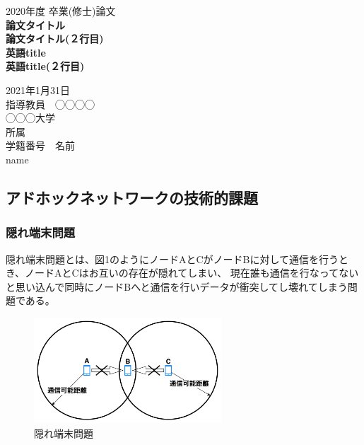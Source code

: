 \documentclass[a4paper, 10pt]{ltjsarticle}
\begin{document}
\thispagestyle{empty}
\begin{center}

\vspace{20mm}
{\Large\noindent 2020年度 卒業(修士)論文}\\
\vspace{40mm}
{\huge\noindent\textbf{論文タイトル}}\\
\medskip
{\huge\noindent\textbf{論文タイトル(２行目)}}\\
\vspace{\baselineskip}
{\huge\noindent\textbf{英語title}}\\
\medskip
{\huge\noindent\textbf{英語title(２行目)}}\\
\vspace{40mm}

{\Large\noindent
2021年1月31日\\
\vspace{\baselineskip}
指導教員　◯◯◯◯    \\
\vspace{\baselineskip}
◯◯◯大学\\
所属 \\
\vspace{\baselineskip}
学籍番号　名前\\
name \\
}
\vspace{40mm}

\end{center}

\thispagestyle{empty}
\clearpage
\subsection{アドホックネットワークの技術的課題}
\subsubsection{隠れ端末問題}
隠れ端末問題とは、図1のようにノードAとCがノードBに対して通信を行うとき、ノードAとCはお互いの存在が隠れてしまい、
現在誰も通信を行なってないと思い込んで同時にノードBへと通信を行いデータが衝突してし壊れてしまう問題である。%
\begin{figure}[H]
  \centering
  \includegraphics[width=70mm]{hidden_terminal_problem.png}
  \caption{隠れ端末問題}
\end{figure}
\end{document}
